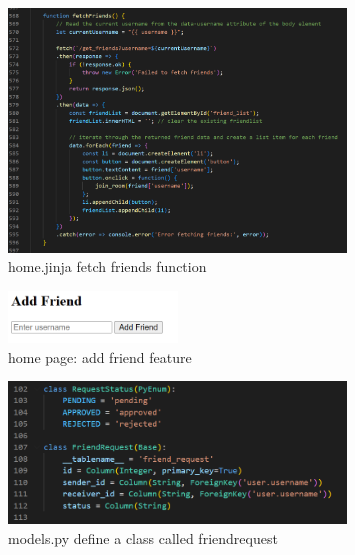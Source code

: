 \documentclass[12pt]{article}
\begin{document}
\begin{enumerate}
		\begin{figure}[H]
                \centering
                \includegraphics[width=0.8\textwidth]{zzrgraphs/home_fetchFriends.png}
                \caption{home.jinja fetch friends function}
                \label{fetchfriends}
            \end{figure}

		\begin{figure}[H]
                \centering
                \includegraphics[width=0.4\textwidth]{zzrgraphs/enter_username.png}
                \caption{home page: add friend feature}
                \label{enterusername}
            \end{figure}

		\begin{figure}[H]
                \centering
                \includegraphics[width=0.8\textwidth]{zzrgraphs/models_friendrequest.png}
                \caption{models.py define a class called friendrequest}
                \label{friendrequestClass}
            \end{figure}


\end{enumerate}
\end{document}
